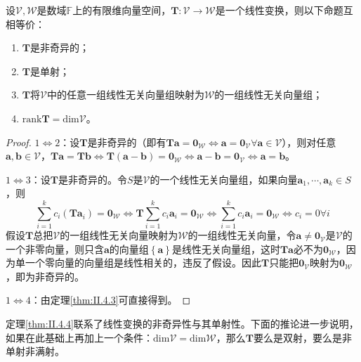 \documentclass[main.tex]{subfiles}
\begin{document}
\begin{theorem}\label{thm:II.4.4}
设$\mathcal{V},\mathcal{W}$是数域$\mathbb{F}$上的有限维向量空间，$\mathbf{T}:\mathcal{V}\rightarrow\mathcal{W}$是一个线性变换，则以下命题互相等价：
\begin{enumerate}
    \item $\mathbf{T}$是非奇异的；
    \item $\mathbf{T}$是单射；
    \item $\mathbf{T}$将$\mathcal{V}$中的任意一组线性无关向量组映射为$\mathcal{W}$的一组线性无关向量组；
    \item $\mathrm{rank}\mathbf{T}=\mathrm{dim}\mathcal{V}$。
\end{enumerate}
\end{theorem}
\begin{proof}
$1\Leftrightarrow 2$：设$\mathbf{T}$是非奇异的（即有$\mathbf{Ta}=\mathbf{0}_\mathcal{W}\Leftrightarrow\mathbf{a}=\mathbf{0}_\mathcal{V}\forall\mathbf{a}\in\mathcal{V}$），则对任意$\mathbf{a},\mathbf{b}\in\mathcal{V}$，$\mathbf{Ta}=\mathbf{Tb}\Leftrightarrow\mathbf{T}\left(\mathbf{a}-\mathbf{b}\right)=\mathbf{0}_\mathcal{W}\Leftrightarrow\mathbf{a}-\mathbf{b}=\mathbf{0}_\mathcal{V}\Leftrightarrow\mathbf{a}=\mathbf{b}$。

$1\Leftrightarrow 3$：设$\mathbf{T}$是非奇异的。令$S$是$\mathcal{V}$的一个线性无关向量组，如果向量$\mathbf{a}_1,\cdots,\mathbf{a}_k\in S$，则
\[
\sum_{i=1}^kc_i\left(\mathbf{Ta}_i\right)=\mathbf{0}_\mathcal{W}\Leftrightarrow\mathbf{T}\sum_{i=1}^kc_i\mathbf{a}_i=\mathbf{0}_\mathcal{W}\Leftrightarrow\sum_{i=1}^kc_i\mathbf{a}_i=\mathbf{0}_\mathcal{W}\Leftrightarrow c_i=0\forall i
\]
假设$\mathbf{T}$总把$\mathcal{V}$的一组线性无关向量映射为$\mathcal{W}$的一组线性无关向量，令$\mathbf{a}\neq\mathbf{0}_\mathcal{V}$是$\mathcal{V}$的一个非零向量，则只含$\mathbf{a}$的向量组$\left\{\mathbf{a}\right\}$是线性无关向量组，这时$\mathbf{Ta}$必不为$\mathbf{0}_\mathcal{W}$，因为单一个零向量的向量组是线性相关的，违反了假设。因此$\mathbf{T}$只能把$\mathbf{0}_\mathcal{V}$映射为$\mathbf{0}_\mathcal{W}$，即为非奇异的。

$1\Leftrightarrow 4$：由定理\ref{thm:II.4.3}可直接得到。
\end{proof}

定理\ref{thm:II.4.4}联系了线性变换的非奇异性与其单射性。下面的推论进一步说明，如果在此基础上再加上一个条件：$\mathrm{dim}\mathcal{V}=\mathrm{dim}\mathcal{W}$，那么$\mathbf{T}$要么是双射，要么是非单射非满射。
\end{document}
